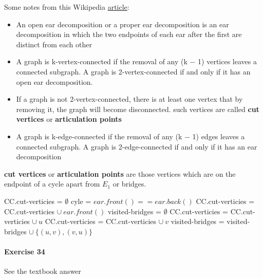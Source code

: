 \documentclass{book}
\begin{document}
	\FloatBarrier
	\par Some notes from this Wikipedia \href{https://en.wikipedia.org/wiki/Ear_decomposition}{article}:
	\begin{itemize}
		\item An open ear decomposition or a proper ear decomposition is an ear decomposition in which the two endpoints of each ear after the first are distinct from each other
		\item A graph is k-vertex-connected if the removal of any (k − 1) vertices leaves a connected subgraph. A graph is 2-vertex-connected if and only if it has an open ear decomposition.
		\item If a graph is not 2-vertex-connected, there is at least one vertex that by removing it, the graph will become disconnected. such vertices are called \textbf{cut vertices} or \textbf{articulation points}
		\item A graph is k-edge-connected if the removal of any (k − 1) edges leaves a connected subgraph. A graph is 2-edge-connected if and only if it has an ear decomposition
	\end{itemize}
	\textbf{cut vertices} or \textbf{articulation points} are those vertices which are on the endpoint of a cycle apart from $E_1$ or bridges.
	\begin{algorithm*}[h!]
		\begin{algorithmic}
				\State {}
					\State CC.cut-verticies = $\emptyset$
					 
						\State cyle = $ear.front() == ear.back()$
							\State CC.cut-verticies = CC.cut-verticies $\cup\ ear.front()$
						\EndIf
					\EndFor
					\State visited-bridges = $\emptyset$
					 
						 
							\State CC.cut-verticies = CC.cut-verticies $\cup\ u$
						\EndIf
						 
							\State CC.cut-verticies = CC.cut-verticies $\cup\ v$							
						\EndIf
						\State visited-bridges = visited-bridges $\cup\ \{(u, v), (v, u)\}$
					\EndFor
				\EndFor
			\EndFunction
		\end{algorithmic}
	\end{algorithm*}
	\FloatBarrier
	
	\paragraph{Exercise 34}
	See the textbook answer
	
\end{document}
